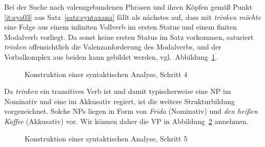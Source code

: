 Bei der Suche nach valenzgebundenen Phrasen und ihren Köpfen gemäß Punkt \ref{it:sya03} aus Satz~\ref{satz:syntaxana} fällt als nächstes auf, dass mit \textit{trinken möchte} eine Folge aus einem infiniten Vollverb im ersten Status und einem finiten Modalverb vorliegt.
Da sonst keine ersten Status im Satz vorkommen, saturiert \textit{trinken} offensichtlich die Valenzanforderung des Modalverbs, und der Verbalkomplex aus beiden kann gebildet werden, vgl.\ Abbildung~\ref{fig:sya04}.

\begin{figure}
  \caption{Konstruktion einer syntaktischen Analyse, Schritt 4}
  \label{fig:sya04}
\end{figure}

Da \textit{trinken} ein transitives Verb ist und damit typischerweise eine NP im Nominativ und eine im Akkusativ regiert, ist die weitere Strukturbildung vorgezeichnet.
Solche NPs liegen in Form von \textit{Frida} (Nominativ) und \textit{den heißen Kaffee} (Akkusativ) vor.
Wir können daher die VP in Abbildung~\ref{fig:sya05} annehmen.

\begin{figure}
  \caption{Konstruktion einer syntaktischen Analyse, Schritt 5}
  \label{fig:sya05}
\end{figure}

